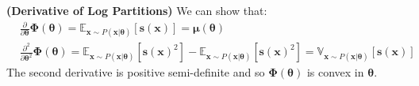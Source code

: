 \begin{proposition}{\textbf{(Derivative of Log Partitions)}}
    We can show that:
    \begin{equation*}
    \begin{aligned}
        &\frac{\partial}{\partial \boldsymbol \theta} \boldsymbol \Phi(\boldsymbol \theta) = \mathbb{E}_{\boldsymbol x \sim P(\boldsymbol x|\boldsymbol \theta)}[\boldsymbol s(\boldsymbol x)] = \boldsymbol \mu(\boldsymbol \theta) \\
        &\frac{\partial^2}{\partial \boldsymbol \theta^2} \boldsymbol \Phi(\boldsymbol \theta) = \mathbb{E}_{\boldsymbol x \sim P(\boldsymbol x|\boldsymbol \theta)}[\boldsymbol s(\boldsymbol x)^2] - \mathbb{E}_{\boldsymbol x\sim P(\boldsymbol x|\boldsymbol \theta)}[\boldsymbol s(\boldsymbol x)^2] = \mathbb{V}_{\boldsymbol x \sim P(\boldsymbol x|\boldsymbol \theta)}[\boldsymbol s(\boldsymbol x)] 
    \end{aligned}
    \end{equation*}
    The second derivative is positive semi-definite and so $\boldsymbol \Phi(\boldsymbol \theta)$ is convex in $\boldsymbol \theta$. 
\end{proposition}
